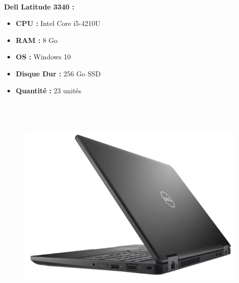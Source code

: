 \documentclass[11pt,a4paper,twoside]{article}
\begin{document}
\paragraph{}\textbf{Dell Latitude 3340 :} \\
\begin{itemize}
\item \textbf{CPU :} Intel Core i5-4210U
\item \textbf{RAM :} 8 Go
\item \textbf{OS :} Windows 10
\item \textbf{Disque Dur :} 256 Go SSD
\item \textbf{Quantité :} 23 unités
\\ \\ \\ \\
\end{itemize}
\begin{figure}
\includegraphics[scale=0.35]{Ressources/Materiel/L5591.jpg}\vspace{-2cm}
\end{figure}
\end{document}
